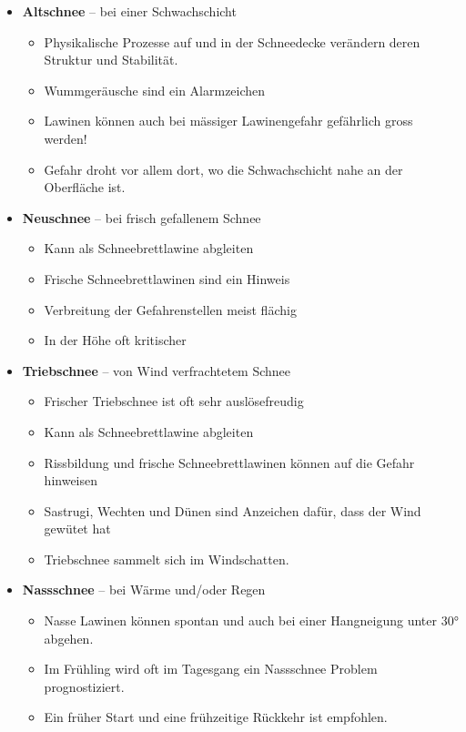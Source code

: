 \begin{itemize}
  \item{
    \textbf{Altschnee} -- bei einer Schwachschicht
    \begin{itemize}
      \item{Physikalische Prozesse auf und in der Schneedecke verändern deren Struktur und Stabilität.}
      \item{Wummgeräusche sind ein Alarmzeichen}
      \item{Lawinen können auch bei mässiger Lawinengefahr gefährlich gross werden!}
      \item{Gefahr droht vor allem dort, wo die Schwachschicht nahe an der Oberfläche ist.}
    \end{itemize}
  }
  \item{
    \textbf{Neuschnee} -- bei frisch gefallenem Schnee
    \begin{itemize}
      \item{Kann als Schneebrettlawine abgleiten}
      \item{Frische Schneebrettlawinen sind ein Hinweis}
      \item{Verbreitung der Gefahrenstellen meist flächig}
      \item{In der Höhe oft kritischer}
    \end{itemize}
  }
  \item{
    \textbf{Triebschnee} -- von Wind verfrachtetem Schnee
    \begin{itemize}
      \item{Frischer Triebschnee ist oft sehr auslösefreudig}
      \item{Kann als Schneebrettlawine abgleiten}
      \item{Rissbildung und frische Schneebrettlawinen können auf die Gefahr hinweisen}
      \item{Sastrugi, Wechten und Dünen sind Anzeichen dafür, dass der Wind gewütet hat}
      \item{Triebschnee sammelt sich im Windschatten.}
    \end{itemize}
  }
  \item{
    \textbf{Nassschnee} -- bei Wärme und/oder Regen
    \begin{itemize}
      \item{Nasse Lawinen können spontan und auch bei einer Hangneigung unter 30° abgehen.}
      \item{Im Frühling wird oft im Tagesgang ein Nassschnee Problem prognostiziert.}
      \item{Ein früher Start und eine frühzeitige Rückkehr ist empfohlen.}

\end{itemize}}
\end{itemize}
